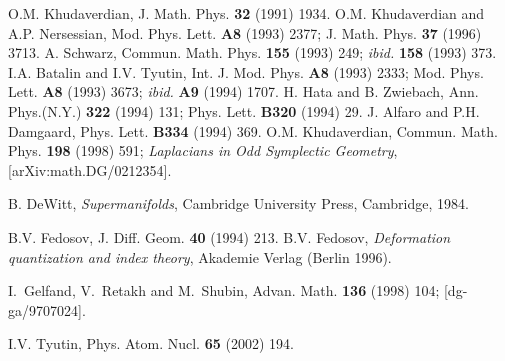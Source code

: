 \documentclass[a4paper,11pt]{article}
\begin{document}
\begin{thebibliography}{99}
  O.M. Khudaverdian, J. Math. Phys. \textbf{32} (1991) 1934.
\newline
O.M. Khudaverdian and A.P. Nersessian, Mod. Phys. Lett. \textbf{A8}
 (1993) 2377; J. Math. Phys. \textbf{37} (1996) 3713. \newline
A. Schwarz, Commun. Math. Phys. \textbf{155} (1993) 249; \textit{%
ibid.} \textbf{158} (1993) 373. \newline
I.A. Batalin and I.V. Tyutin, Int. J. Mod. Phys. \textbf{A8} (1993) 2333;
Mod. Phys. Lett. \textbf{A8} (1993) 3673; \textit{ibid.}
\textbf{A9} (1994) 1707. \newline
H. Hata and B. Zwiebach, Ann. Phys.(N.Y.) \textbf{322} (1994) 131;
Phys. Lett. \textbf{B320} (1994) 29.
\newline
J. Alfaro and P.H. Damgaard, Phys. Lett. \textbf{B334} (1994) 369.%
\newline
O.M. Khudaverdian, Commun. Math. Phys. \textbf{198} (1998) 591;
\textit{Laplacians in Odd Symplectic Geometry}, [arXiv:math.DG/0212354].

  B. DeWitt, \textit{Supermanifolds}, Cambridge University
Press, Cambridge, 1984.

  B.V. Fedosov, J. Diff. Geom. \textbf{40} (1994) 213.%
\newline
B.V. Fedosov, \textit{Deformation quantization and index theory}, Akademie
Verlag (Berlin 1996).

  I.~Gelfand, V.~Retakh and M.~Shubin, Advan. Math.
\textbf{136} (1998) 104; [dg-ga/9707024].

  I.V. Tyutin, Phys. Atom. Nucl. \textbf{65} (2002) 194.

\end{thebibliography}
\end{document}
